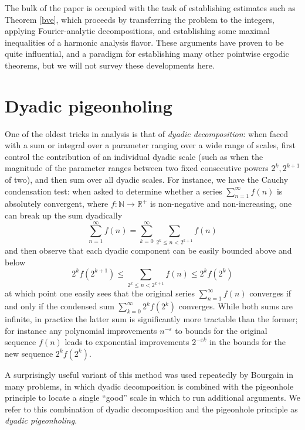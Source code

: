 \documentclass[12pt,a4paper,reqno]{amsart}
\numberwithin{equation}{section}
\theoremstyle{plain}
\theoremstyle{definition}
\newcommand\R{\mathbb{R}}
\newcommand\N{\mathbb{N}}
\newcommand\eps{\varepsilon}
\begin{document}
The bulk of the paper \cite{ergodic} is occupied with the task of establishing estimates such as Theorem \ref{bve}, which proceeds by transferring the problem to the integers, applying Fourier-analytic decompositions, and establishing some maximal inequalities of a harmonic analysis flavor.  These arguments have proven to be quite influential, and a paradigm for establishing many other pointwise ergodic theorems, but we will not survey these developments here.

\section{Dyadic pigeonholing}\label{dyadic-sec}

One of the oldest tricks in analysis is that of \emph{dyadic decomposition}: when faced with a sum or integral over a parameter ranging over a wide range of scales, first control the contribution of an individual dyadic scale (such as when the magnitude of the parameter ranges between two fixed consecutive powers $2^k, 2^{k+1}$ of two), and then sum over all dyadic scales.  For instance, we have the Cauchy condensation test: when asked to determine whether a series $\sum_{n=1}^\infty f(n)$ is absolutely convergent, where $f: \N \to \R^+$ is non-negative and non-increasing, one can break up the sum dyadically
$$ \sum_{n=1}^\infty f(n) = \sum_{k=0}^\infty \sum_{2^k \leq n < 2^{k+1}} f(n)$$
and then observe that each dyadic component can be easily bounded above and below
$$ 2^k f(2^{k+1}) \leq \sum_{2^k \leq n < 2^{k+1}} f(n) \leq 2^k f(2^k)$$
at which point one easily sees that the original series $\sum_{n=1}^\infty f(n)$ converges if and only if the condensed sum $\sum_{k=0}^\infty 2^k f(2^k)$ converges.  While both sums are infinite, in practice the latter sum is significantly more tractable than the former; for instance any polynomial improvements $n^{-\eps}$ to bounds for the original sequence $f(n)$ leads to exponential improvements $2^{-\eps k}$ in the bounds for the new sequence $2^k f(2^k)$.  

A surprisingly useful variant of this method was used repeatedly by Bourgain in many problems, in which dyadic decomposition is combined with the pigeonhole principle to locate a single ``good'' scale in which to run additional arguments.  We refer to this combination of dyadic decomposition and the pigeonhole principle as \emph{dyadic pigeonholing}.  
\end{document}

